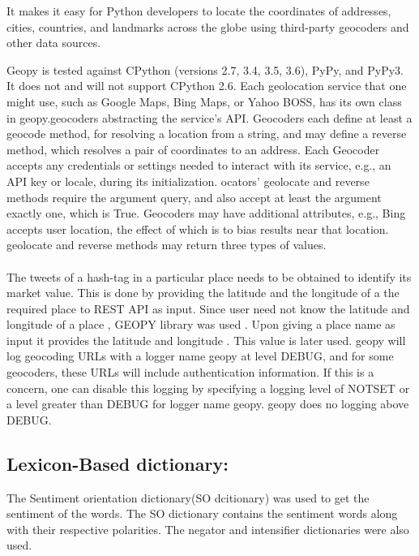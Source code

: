 It makes it easy for Python developers to locate the coordinates of addresses, cities, countries, and landmarks across the globe using third-party geocoders and other data sources.

Geopy is tested against CPython (versions 2.7, 3.4, 3.5, 3.6), PyPy, and PyPy3. It does not and will not support CPython 2.6.
Each geolocation service that one might use, such as Google Maps, Bing Maps, or Yahoo BOSS, has its own class in geopy.geocoders abstracting the service’s API. Geocoders each define at least a geocode method, for resolving a location from a string, and may define a reverse method, which resolves a pair of coordinates to an address. Each Geocoder accepts any credentials or settings needed to interact with its service, e.g., an API key or locale, during its initialization.
ocators’ geolocate and reverse methods require the argument query, and also accept at least the argument exactly one, which is True. Geocoders may have additional attributes, e.g., Bing accepts user location, the effect of which is to bias results near that location. geolocate and reverse methods may return three types of values.
\paragraph{}The tweets of a hash-tag in a particular place needs to be obtained to identify its market value. This is done by providing the latitude and the longitude of a the required place to REST API as input. Since user need not know the latitude and longitude of  a place , GEOPY library was used . Upon giving a place name as input it provides the latitude and longitude . This value is later used. geopy will log geocoding URLs with a logger name geopy at level DEBUG, and for some geocoders, these URLs will include authentication information. If this is a concern, one can disable this logging by specifying a logging level of NOTSET or a level greater than DEBUG for logger name geopy. geopy does no logging above DEBUG.
\subsection{Lexicon-Based dictionary:}
The Sentiment orientation dictionary(SO dcitionary) was used to get the sentiment of the words. The SO dictionary contains the sentiment words along with their respective polarities. The negator and intensifier dictionaries were also used.
